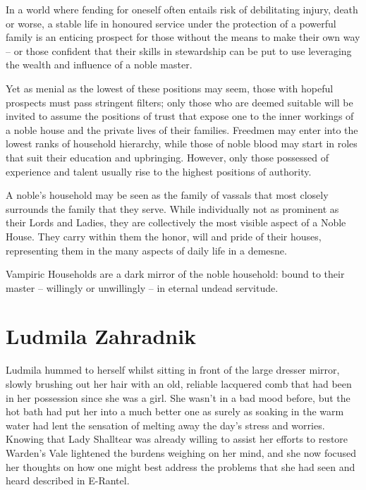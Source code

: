  

In a world where fending for oneself often entails risk of debilitating injury, death or worse, a stable life in honoured service under the protection of a powerful family is an enticing prospect for those without the means to make their own way – or those confident that their skills in stewardship can be put to use leveraging the wealth and influence of a noble master.

 

Yet as menial as the lowest of these positions may seem, those with hopeful prospects must pass stringent filters; only those who are deemed suitable will be invited to assume the positions of trust that expose one to the inner workings of a noble house and the private lives of their families. Freedmen may enter into the lowest ranks of household hierarchy, while those of noble blood may start in roles that suit their education and upbringing. However, only those possessed of experience and talent usually rise to the highest positions of authority.

 

A noble's household may be seen as the family of vassals that most closely surrounds the family that they serve. While individually not as prominent as their Lords and Ladies, they are collectively the most visible aspect of a Noble House. They carry within them the honor, will and pride of their houses, representing them in the many aspects of daily life in a demesne.

 

Vampiric Households are a dark mirror of the noble household: bound to their master – willingly or unwillingly – in eternal undead servitude.



\chapter{Ludmila Zahradnik}

Ludmila hummed to herself whilst sitting in front of the large dresser mirror, slowly brushing out her hair with an old, reliable lacquered comb that had been in her possession since she was a girl. She wasn’t in a bad mood before, but the hot bath had put her into a much better one as surely as soaking in the warm water had lent the sensation of melting away the day’s stress and worries. Knowing that Lady Shalltear was already willing to assist her efforts to restore Warden’s Vale lightened the burdens weighing on her mind, and she now focused her thoughts on how one might best address the problems that she had seen and heard described in E-Rantel.

